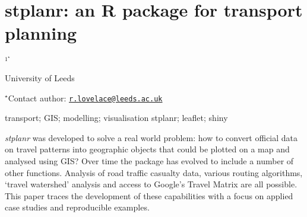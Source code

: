 \documentclass[\main/boa.tex]{subfiles}
\begin{document}
\section{stplanr: an R package for transport planning}

\begin{center}
  {\bf {}$^{1^\star}$}
\end{center}

\vskip 0.3cm

\begin{affiliations}
\begin{enumerate}
\begin{minipage}{0.915\textwidth}
\centering
\item University of Leeds \\[-2pt]
\end{minipage}
\end{enumerate}
$^\star$Contact author: \href{mailto:r.lovelace@leeds.ac.uk}{\nolinkurl{r.lovelace@leeds.ac.uk}}\\
\end{affiliations}

\vskip 0.5cm

\begin{minipage}{0.915\textwidth}
\keywords transport; GIS; modelling; visualisation
\packages stplanr; leaflet; shiny
\end{minipage}

\vskip 0.8cm

\emph{stplanr} was developed to solve a real world problem: how to
convert official data on travel patterns into geographic objects that
could be plotted on a map and analysed using GIS? Over time the package
has evolved to include a number of other functions. Analysis of road
traffic casualty data, various routing algorithms, `travel watershed'
analysis and access to Google's Travel Matrix are all possible. This
paper traces the development of these capabilities with a focus on
applied case studies and reproducible examples.
\end{document}
